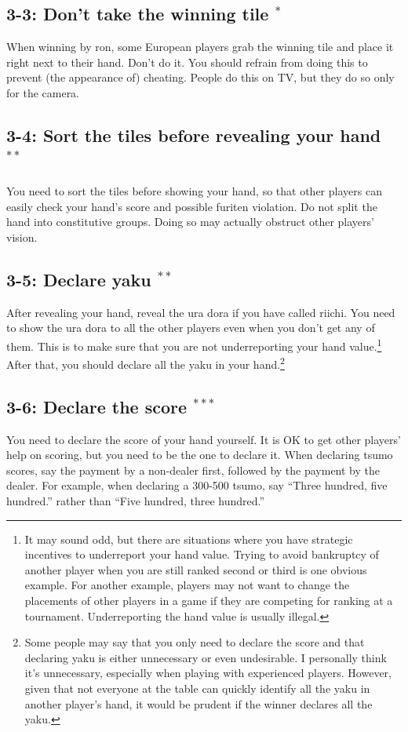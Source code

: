 \subsection*{3-3: Don't take the winning tile $^{*}$}
When winning by {\jap ron}, some European players grab the winning tile and place it right next to their hand. Don't do it. You should refrain from doing this to prevent (the appearance of) cheating. People do this on TV, but they do so only for the camera.

\subsection*{3-4: Sort the tiles before revealing your hand $^{**}$}
You need to sort the tiles before showing your hand, so that other players can easily check your hand's score and possible {\jap furiten} violation. Do not split the hand into constitutive groups. Doing so may actually obstruct other players' vision.

\subsection*{3-5: Declare {\jap yaku} $^{**}$}
After revealing your hand, reveal the {\jap ura dora} if you have called riichi. You need to show the {\jap ura dora} to all the other players even when you don't get any of them. This is to make sure that you are not underreporting your hand value.\footnote{It may sound odd, but there are situations where you have strategic incentives to underreport your hand value. Trying to avoid bankruptcy of another player when you are still ranked second or third is one obvious example. For another example, players may not want to change the placements of other players in a game if they are competing for ranking at a tournament. Underreporting the hand value is usually illegal.}
After that, you should declare all the {\jap yaku} in your hand.\footnote{Some people may say that you only need to declare the score and that declaring {\jap yaku} is either unnecessary or even undesirable. I personally think it's unnecessary, especially when playing with experienced players. However, given that not everyone at the table can quickly identify all the {\jap yaku} in another player's hand, it would be prudent if the winner declares all the {\jap yaku}.}

\subsection*{3-6: Declare the score $^{***}$}
You need to declare the score of your hand yourself.
It is OK to get other players' help on scoring, but you need to be the one to declare it. When declaring {\jap tsumo} scores, say the payment by a non-dealer first, followed by the payment by the dealer. For example, when declaring a 300-500 {\jap tsumo}, say ``Three hundred, five hundred.'' rather than ``Five hundred, three hundred.''

